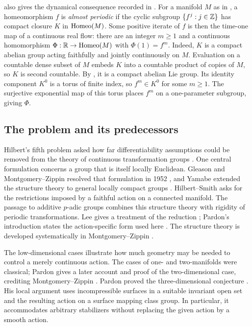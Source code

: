  also gives the dynamical consequence recorded in
\cite[Conjecture~1.4]{Pardon2013}. For a manifold $M$ as in
, a homeomorphism $f$ is \emph{almost periodic} if the
cyclic subgroup $\{f^j:j\in\mathbb Z\}$ has compact closure $K$ in
$\operatorname{Homeo}(M)$. Some positive iterate of $f$ is then the time-one map
of a continuous real flow: there are an integer $m\geq1$ and a
continuous homomorphism $\Phi:\mathbb R\to\operatorname{Homeo}(M)$ with
$\Phi(1)=f^m$. Indeed, $K$ is a compact abelian group acting faithfully
and jointly continuously on $M$. Evaluation on a countable dense
subset of $M$ embeds $K$ into a countable product of copies of $M$,
so $K$ is second countable. By , it is a compact abelian
Lie group. Its identity component $K^0$ is a torus of finite index,
so $f^m\in K^0$ for some $m\geq1$. The surjective exponential map
of this torus places $f^m$ on a one-parameter subgroup, giving $\Phi$.

\subsection{The problem and its predecessors}

Hilbert's fifth problem asked how far differentiability assumptions
could be removed from the theory of continuous transformation groups
\cite[Problem~5]{Hilbert1902}.
One central formulation concerns a group that is itself locally
Euclidean. Gleason and Montgomery--Zippin resolved that formulation in
1952 \cite{Gleason1952,MontgomeryZippin1952}, and Yamabe extended the
structure theory to general locally compact groups
\cite{Yamabe1953a,Yamabe1953b}.
Hilbert--Smith asks for the restrictions imposed by a faithful action
on a connected manifold. The passage to additive $p$-adic groups
combines this structure theory with rigidity of periodic
transformations. Lee gives a treatment of the reduction
\cite{Lee1997}; Pardon's introduction states the action-specific form
used here \cite[Introduction, p.~1]{Pardon2013}. The structure theory is
developed systematically in Montgomery--Zippin
\cite{MontgomeryZippin1955}.

The low-dimensional cases illustrate how much geometry may be needed to
control a merely continuous action.  The cases of one- and two-manifolds
were classical; Pardon gives a later account and proof of the
two-dimensional case, crediting Montgomery--Zippin
\cite{Pardon2019}.  Pardon proved the three-dimensional conjecture
\cite[Theorem~1.5]{Pardon2013}.  His local argument uses incompressible
surfaces in a suitable invariant open set and the resulting action on a
surface mapping class group.  In particular, it accommodates arbitrary
stabilizers without replacing the given action by a smooth action.

